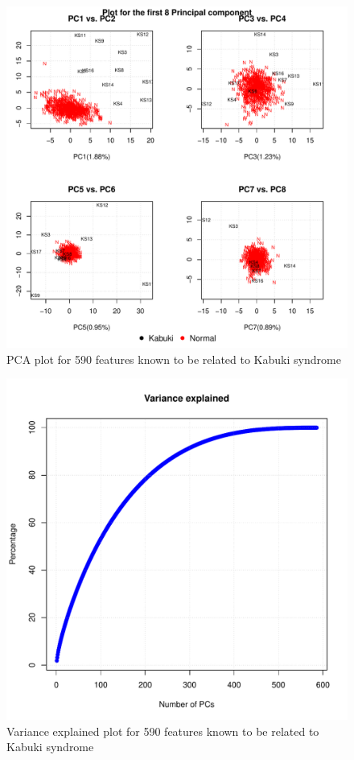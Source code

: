 \begin{figure}[!h]
    \centering
    \includegraphics[width=\textwidth]{figures/PCA/590/pca_plot_label.pdf}
    \caption{PCA plot for 590 features known to be related to Kabuki syndrome}
    \label{fig:590-PCA}
\end{figure}
\begin{figure}[!h]
    \centering
    \includegraphics[width=0.5\columnwidth]{figures/PCA/590/var_expl.pdf}
    \caption{Variance explained plot for 590 features known to be related to Kabuki syndrome}
    \label{fig:590-varexpl}
\end{figure}
\

